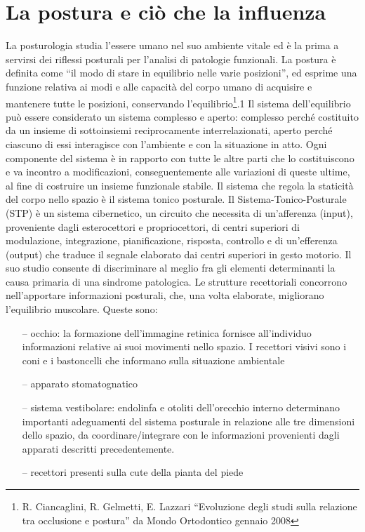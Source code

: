 \chapter{La postura e ciò che la influenza}

La posturologia studia l’essere umano nel suo ambiente vitale ed è la prima a servirsi dei riflessi posturali per l’analisi di patologie funzionali. La postura è definita come “il modo di stare in equilibrio nelle varie posizioni”, ed esprime una funzione relativa ai modi e alle capacità del corpo umano di acquisire e mantenere tutte le posizioni, conservando l’equilibrio\footnote{R. Ciancaglini, R. Gelmetti, E. Lazzari “Evoluzione degli studi sulla relazione tra occlusione e postura” da Mondo Ortodontico gennaio 2008}.1 Il sistema dell’equilibrio può essere considerato un sistema complesso e aperto: complesso perché costituito da un insieme di sottoinsiemi reciprocamente interrelazionati, aperto perché ciascuno di essi interagisce con l’ambiente e con la situazione in atto. Ogni componente del sistema è in rapporto con tutte le altre parti che lo costituiscono e va incontro a modificazioni, conseguentemente alle variazioni di queste ultime, al fine di costruire un insieme funzionale stabile. Il sistema che regola la staticità del corpo nello spazio è il sistema tonico posturale. Il Sistema-Tonico-Posturale (STP) è un sistema cibernetico, un circuito che necessita di un’afferenza (input), proveniente dagli esterocettori e propriocettori, di centri superiori di modulazione, integrazione, pianificazione, risposta, controllo e di un’efferenza (output) che traduce il segnale elaborato dai centri superiori in gesto motorio. Il suo studio consente di discriminare al meglio fra gli elementi determinanti la causa primaria di una sindrome patologica. Le strutture recettoriali concorrono nell’apportare informazioni posturali, che, una volta elaborate, migliorano l’equilibrio muscolare. Queste sono:

 \begin{itemize}
 \itemsep-0.5em 
 \item[--]occhio: la formazione dell’immagine retinica fornisce all’individuo informazioni relative ai suoi movimenti nello spazio. I recettori visivi sono i coni e i bastoncelli che informano sulla situazione ambientale
 \item[--]apparato stomatognatico
 \item[--]sistema vestibolare: endolinfa e otoliti dell’orecchio interno determinano importanti adeguamenti del sistema posturale in relazione alle tre dimensioni dello spazio, da coordinare/integrare con le informazioni provenienti dagli apparati descritti precedentemente.
 \item[--]recettori presenti sulla cute della pianta del piede
 \end{itemize}
 
